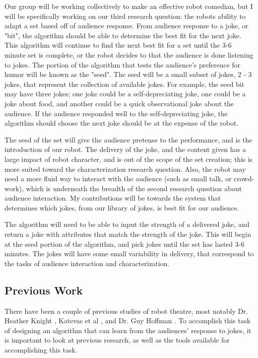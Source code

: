 Our group will be working collectively to make an effective robot comedian, but I will be specifically working on our third research question: the robots ability to adapt a set based off of audience response. From audience response to a joke, or "bit", the algorithm should be able to determine the best fit for the next joke. This algorithm will continue to find the next best fit for a set until the 3-6 minute set is complete, or the robot decides to that the audience is done listening to jokes. The portion of the algorithm that tests the audience's preference for humor will be known as the "seed". The seed will be a small subset of jokes, 2 - 3 jokes, that represent the collection of available jokes. For example, the seed bit may have three jokes; one joke could be a self-depreciating joke, one could be a joke about food, and another could be a quick observational joke about the audience. If the audience responded well to the self-depreciating joke, the algorithm should choose the next joke should be at the expense of the robot.

The seed of the set will give the audience pretense to the performance, and is the introduction of our robot. The delivery of the joke, and the content given has a large impact of robot character, and is out of the scope of the set creation; this is more suited toward the characterization research question. Also, the robot may need a more fluid way to interact with the audience (such as small talk, or crowd-work), which is underneath the breadth of the second research question about audience interaction. My contributions will be towards the system that determines which jokes, from our library of jokes, is best fit for our audience.

The algorithm will need to be able to input the strength of a delivered joke, and return a joke with attributes that match the strength of the joke. This will begin at the seed portion of the algorithm, and pick jokes until the set has lasted 3-6 minutes. The jokes will have some small variability in delivery, that correspond to the tasks of audience interaction and characterization.

\subsection{Previous Work}
    There have been a couple of previous studies of robot theatre, most notably Dr. Heather Knight \cite{KnightEightLessons:2011}, Katevas et al \cite{KatevasRobot:2014}, and Dr. Guy Hoffman \cite{hoffman2010anticipation}. To accomplish this task of designing an algorithm that can learn from the audiences' response to jokes, it is important to look at previous research, as well as the tools available for accomplishing this task.

